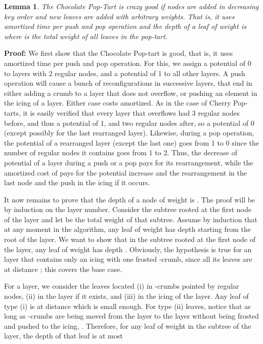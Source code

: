 \documentclass[11pt]{article}
\newtheorem{lemma}[theorem]{Lemma}
\newenvironment{proof}{\noindent\textbf{Proof: }\ignorespaces}
  {\hspace*{\fill}\medskip}
\begin{document}
\begin{lemma}\label{lem:chocolate-pop-tart}
The Chocolate Pop-Tart is crazy good if nodes are added in decreasing
key order and new leaves are added with arbitrary weights.
That is, it uses  amortized time per push and pop operation and
the depth of a leaf of weight  is  where  is the
total weight of all leaves in the pop-tart.
\end{lemma}
\begin{proof}
We first show that the Chocolate Pop-tart is good, that is, it uses
 amortized time per push and pop operation.
For this, we assign a potential of 0 to layers with 2 regular nodes,
and a potential of 1 to all other layers. 
A push operation will cause a bunch of reconfigurations in successive
layers, that end in either adding a crumb to a layer that does not
overflow, or pushing an element in the icing of a layer. Either case
costs  amortized. As in the case of Cherry Pop-tarts, it is
easily verified that every layer that overflows had 3 regular nodes
before, and thus a potential of 1, and two regular nodes after, so a
potential of 0 (except possibly for the last rearranged layer).
Likewise, during a pop operation, the potential of a rearranged layer
(except the last one) goes from 1 to 0 since the number of regular
nodes it contains goes from 1 to 2.
Thus, the decrease of potential of a layer during a push or a pop pays
for its rearrangement, while the amortized cost of  pays for the
potential increase and the rearrangement in the last node and the push
in the icing if it occurs.

It now remains to prove that the depth of a node of weight  is
. 
The proof will be by induction on the layer number. Consider the subtree
rooted at the first node of the  layer and let  be the
total weight of that subtree.
Assume by induction that at any moment in the algorithm, any leaf of weight  has
depth  starting from the
root of the  layer. 
We want to show that in the subtree rooted at the first node of the
 layer, any leaf of weight  has depth 
.
Obviously, the hypothesis is true for an  layer 
that contains only an icing with one frosted -crumb,
since all its leaves are at distance ;
this covers the base case.

For a  layer, we consider the leaves located 
(i) in -crumbs pointed by regular nodes, 
(ii) in the  layer if it exists, and 
(iii) in the icing of the  layer.
Any leaf of type (i) is at distance  which is small enough.
For type (ii) leaves, notice that as long as -crumbs are being moved
from the  layer to the  layer without being
frosted and pushed to the icing, . Therefore, for
any leaf of weight  in the subtree of the  layer, the
depth of that leaf is at most 


\end{proof}
\end{document}
